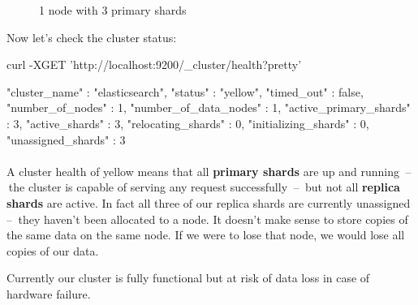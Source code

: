 \documentclass{article}%
\begin{document}
\begin{figure}[h!]
	\centering
	\caption{1 node with 3 primary shards}
\end{figure}

Now let's check the cluster status:

\begin{command}
curl -XGET 'http://localhost:9200/_cluster/health?pretty'
\end{command}

\begin{command}
{
	"cluster_name" : "elasticsearch",
	"status" : "yellow",
	"timed_out" : false,
	"number_of_nodes" : 1,
	"number_of_data_nodes" : 1,
	"active_primary_shards" : 3,
	"active_shards" : 3,
	"relocating_shards" : 0,
	"initializing_shards" : 0,
	"unassigned_shards" : 3
}
\end{command}

\paragraph{} A cluster health of yellow means that all \textbf{primary shards} are up and running  --  the cluster is capable of serving any request successfully  --  but not all \textbf{replica shards} are active. In fact all three of our replica shards are currently unassigned  --  they haven’t been allocated to a node. It doesn’t make sense to store copies of the same data on the same node. If we were to lose that node, we would lose all copies of our data.

Currently our cluster is fully functional but at risk of data loss in case of hardware failure.
\end{document}
